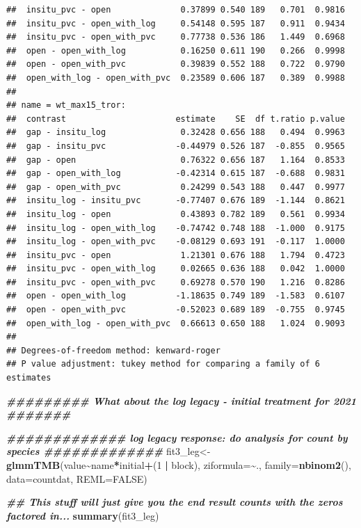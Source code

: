 \documentclass[
]{article}
\newenvironment{Shaded}{\begin{snugshade}}{\end{snugshade}}
\newcommand{\AttributeTok}[1]{\textcolor[rgb]{0.13,0.29,0.53}{#1}}
\newcommand{\ConstantTok}[1]{\textcolor[rgb]{0.56,0.35,0.01}{#1}}
\newcommand{\DecValTok}[1]{\textcolor[rgb]{0.00,0.00,0.81}{#1}}
\newcommand{\DocumentationTok}[1]{\textcolor[rgb]{0.56,0.35,0.01}{\textbf{\textit{#1}}}}
\newcommand{\FunctionTok}[1]{\textcolor[rgb]{0.13,0.29,0.53}{\textbf{#1}}}
\newcommand{\NormalTok}[1]{#1}
\newcommand{\OtherTok}[1]{\textcolor[rgb]{0.56,0.35,0.01}{#1}}
\newcommand{\SpecialCharTok}[1]{\textcolor[rgb]{0.81,0.36,0.00}{\textbf{#1}}}
\begin{document}
\begin{verbatim}
##  insitu_pvc - open              0.37899 0.540 189   0.701  0.9816
##  insitu_pvc - open_with_log     0.54148 0.595 187   0.911  0.9434
##  insitu_pvc - open_with_pvc     0.77738 0.536 186   1.449  0.6968
##  open - open_with_log           0.16250 0.611 190   0.266  0.9998
##  open - open_with_pvc           0.39839 0.552 188   0.722  0.9790
##  open_with_log - open_with_pvc  0.23589 0.606 187   0.389  0.9988
## 
## name = wt_max15_tror:
##  contrast                      estimate    SE  df t.ratio p.value
##  gap - insitu_log               0.32428 0.656 188   0.494  0.9963
##  gap - insitu_pvc              -0.44979 0.526 187  -0.855  0.9565
##  gap - open                     0.76322 0.656 187   1.164  0.8533
##  gap - open_with_log           -0.42314 0.615 187  -0.688  0.9831
##  gap - open_with_pvc            0.24299 0.543 188   0.447  0.9977
##  insitu_log - insitu_pvc       -0.77407 0.676 189  -1.144  0.8621
##  insitu_log - open              0.43893 0.782 189   0.561  0.9934
##  insitu_log - open_with_log    -0.74742 0.748 188  -1.000  0.9175
##  insitu_log - open_with_pvc    -0.08129 0.693 191  -0.117  1.0000
##  insitu_pvc - open              1.21301 0.676 188   1.794  0.4723
##  insitu_pvc - open_with_log     0.02665 0.636 188   0.042  1.0000
##  insitu_pvc - open_with_pvc     0.69278 0.570 190   1.216  0.8286
##  open - open_with_log          -1.18635 0.749 189  -1.583  0.6107
##  open - open_with_pvc          -0.52023 0.689 189  -0.755  0.9745
##  open_with_log - open_with_pvc  0.66613 0.650 188   1.024  0.9093
## 
## Degrees-of-freedom method: kenward-roger 
## P value adjustment: tukey method for comparing a family of 6 estimates
\end{verbatim}

\begin{Shaded}
\begin{Highlighting}[]
\DocumentationTok{\#\#\#\#\#\#\#\#\# What about the log legacy {-} initial treatment for 2021 \#\#\#\#\#\#\#}

\DocumentationTok{\#\#\#\#\#\#\#\#\#\#\#\#\# log legacy response: do analysis for count by species \#\#\#\#\#\#\#\#\#\#\#\#\# }
\NormalTok{fit3\_leg}\OtherTok{\textless{}{-}}\FunctionTok{glmmTMB}\NormalTok{(value}\SpecialCharTok{\textasciitilde{}}\NormalTok{name}\SpecialCharTok{*}\NormalTok{initial}\SpecialCharTok{+}\NormalTok{(}\DecValTok{1} \SpecialCharTok{|}\NormalTok{ block), }\AttributeTok{ziformula=}\SpecialCharTok{\textasciitilde{}}\NormalTok{., }\AttributeTok{family=}\FunctionTok{nbinom2}\NormalTok{(), }\AttributeTok{data=}\NormalTok{countdat, }\AttributeTok{REML=}\ConstantTok{FALSE}\NormalTok{)}

\DocumentationTok{\#\# This stuff will just give you the end result counts with the zeros factored in...}
\FunctionTok{summary}\NormalTok{(fit3\_leg)}
\end{Highlighting}
\end{Shaded}
\end{document}
